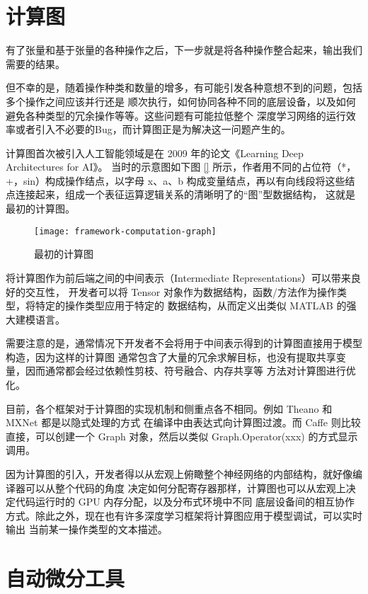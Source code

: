 \section{计算图}\label{sec:computation-graph}

有了张量和基于张量的各种操作之后，下一步就是将各种操作整合起来，输出我们需要的结果。

但不幸的是，随着操作种类和数量的增多，有可能引发各种意想不到的问题，包括多个操作之间应该并行还是
顺次执行，如何协同各种不同的底层设备，以及如何避免各种类型的冗余操作等等。这些问题有可能拉低整个
深度学习网络的运行效率或者引入不必要的Bug，而计算图正是为解决这一问题产生的。

计算图首次被引入人工智能领域是在 2009 年的论文《Learning Deep Architectures for AI》。
当时的示意图如下图 \ref{} 所示，作者用不同的占位符（*，+，sin）构成操作结点，以字母 x、a、b
构成变量结点，再以有向线段将这些结点连接起来，组成一个表征运算逻辑关系的清晰明了的“图”型数据结构，
这就是最初的计算图。

\begin{figure}[hbtp]
\centering
\texttt{[image: framework-computation-graph]}
\caption{最初的计算图}
\label{fig:framework-computation-graph}
\end{figure}

将计算图作为前后端之间的中间表示（Intermediate Representations）可以带来良好的交互性，
开发者可以将 Tensor 对象作为数据结构，函数/方法作为操作类型，将特定的操作类型应用于特定的
数据结构，从而定义出类似 MATLAB 的强大建模语言。

需要注意的是，通常情况下开发者不会将用于中间表示得到的计算图直接用于模型构造，因为这样的计算图
通常包含了大量的冗余求解目标，也没有提取共享变量，因而通常都会经过依赖性剪枝、符号融合、内存共享等
方法对计算图进行优化。

目前，各个框架对于计算图的实现机制和侧重点各不相同。例如 Theano 和 MXNet 都是以隐式处理的方式
在编译中由表达式向计算图过渡。而 Caffe 则比较直接，可以创建一个 Graph 对象，然后以类似
Graph.Operator(xxx) 的方式显示调用。

因为计算图的引入，开发者得以从宏观上俯瞰整个神经网络的内部结构，就好像编译器可以从整个代码的角度
决定如何分配寄存器那样，计算图也可以从宏观上决定代码运行时的 GPU 内存分配，以及分布式环境中不同
底层设备间的相互协作方式。除此之外，现在也有许多深度学习框架将计算图应用于模型调试，可以实时输出
当前某一操作类型的文本描述。


\section{自动微分工具}\label{sec:automatic-differentiation}

